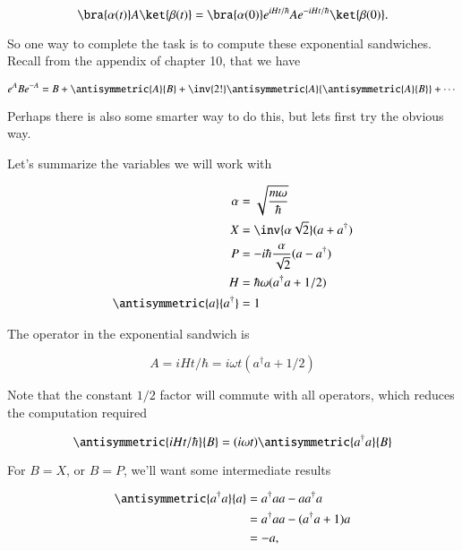 \begin{equation}\label{eqn:desaiCh9:101}
\bra{\alpha(t) } A \ket{ \beta(t) }
=
\bra{\alpha(0) } e^{i H t/\hbar} A e^{-i H t/\hbar} \ket{ \beta(0) }.
\end{equation}

So one way to complete the task is to compute these exponential sandwiches.  Recall from the appendix of chapter 10, that we have

\begin{equation}\label{eqn:desaiCh9:102}
e^A B e^{-A}
= B + \antisymmetric{A}{B}
+ \inv{2!} \antisymmetric{A}{\antisymmetric{A}{B}} + \cdots
\end{equation}

Perhaps there is also some smarter way to do this, but lets first try the obvious way.  

Let's summarize the variables we will work with

\begin{align}\label{eqn:desaiCh9:103}
\alpha &= \sqrt{\frac{m \omega}{\hbar}} \\
X &= \inv{\alpha \sqrt{2}} ( a + a^\dagger ) \\
P &= -i \hbar \frac{\alpha}{\sqrt{2}} ( a - a^\dagger ) \\
H &= \hbar \omega ( a^\dagger a + 1/2 ) \\
\antisymmetric{a}{a^\dagger} &= 1 
\end{align}

The operator in the exponential sandwich is

\begin{equation}\label{eqn:desaiCh9:104}
A = i H t/\hbar = i \omega t ( a^\dagger a + 1/2 )
\end{equation}

Note that the constant $1/2$ factor will commute with all operators, which reduces the computation required

\begin{equation}\label{eqn:desaiCh9:105}
\antisymmetric{i H t/\hbar} {B } = (i\omega t) \antisymmetric{a^\dagger a}{B}
\end{equation}

For $B = X$, or $B = P$, we'll want some intermediate results

\begin{align*}
\antisymmetric{a^\dagger a}{a}
&=
a^\dagger a a - a a^\dagger a \\ 
&=
a^\dagger a a - (a^\dagger a + 1) a \\ 
&=
-a,
\end{align*}

